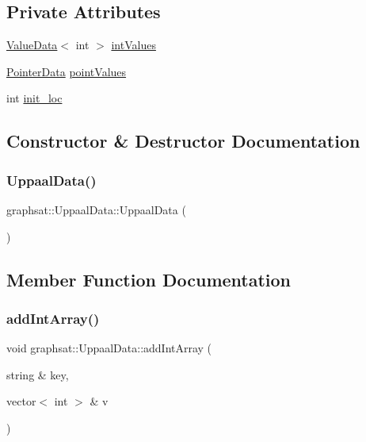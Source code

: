 \subsection*{Private Attributes}
\begin{DoxyCompactItemize}
\item 
\mbox{\hyperlink{classgraphsat_1_1_value_data}{Value\+Data}}$<$ int $>$ \mbox{\hyperlink{classgraphsat_1_1_uppaal_data_ac66879b386bccbf6c2eaaf57e7833aec}{int\+Values}}
\item 
\mbox{\hyperlink{classgraphsat_1_1_pointer_data}{Pointer\+Data}} \mbox{\hyperlink{classgraphsat_1_1_uppaal_data_a6500c3a0e849e24a39f865fc243a612a}{point\+Values}}
\item 
int \mbox{\hyperlink{classgraphsat_1_1_uppaal_data_a3b2012d94f9db575f4dea5dd450ef7ec}{init\+\_\+loc}}
\end{DoxyCompactItemize}


\subsection{Constructor \& Destructor Documentation}
\mbox{\label{classgraphsat_1_1_uppaal_data_af50032132fe9113f17b9d4f669832bcf}} 
\subsubsection{\texorpdfstring{UppaalData()}{UppaalData()}}
{\footnotesize\ttfamily graphsat\+::\+Uppaal\+Data\+::\+Uppaal\+Data (\begin{DoxyParamCaption}{ }\end{DoxyParamCaption})\hspace{0.3cm}{\ttfamily [inline]}}



\subsection{Member Function Documentation}
\mbox{\label{classgraphsat_1_1_uppaal_data_a7efc419d4d89f6f54f1b37e6a0ac76da}} 
\subsubsection{\texorpdfstring{addIntArray()}{addIntArray()}}
{\footnotesize\ttfamily void graphsat\+::\+Uppaal\+Data\+::add\+Int\+Array (\begin{DoxyParamCaption}\item[{string \&}]{key,  }\item[{vector$<$ int $>$ \&}]{v }\end{DoxyParamCaption})\hspace{0.3cm}{\ttfamily [inline]}}

